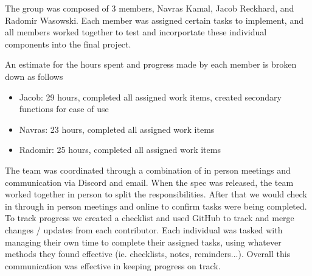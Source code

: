 The group was composed of 3 members, Navras Kamal, Jacob Reckhard, and
Radomir Wasowski.  Each member was assigned certain tasks to implement, and
all members worked together to test and incorportate these individual
components into the final project.

An estimate for the hours spent and progress made by each member is broken down as follows
\begin{itemize}
\item{Jacob: 29 hours, completed all assigned work items, created secondary functions for ease of use}
\item{Navras: 23 hours, completed all assigned work items}
\item{Radomir: 25 hours, completed all assigned work items}
\end{itemize}

The team was coordinated through a combination of in person meetings and
communication via Discord and email.  When the spec was released, the team
worked together in person to split the responsibilities.  After that we would
check in through in person meetings and online to confirm tasks were being
completed.  To track progress we created a checklist and used GitHub to track
and merge changes / updates from each contributor.  Each individual was tasked
with managing their own time to complete their assigned tasks, using whatever
methods they found effective (ie. checklists, notes, reminders...).  Overall
this communication was effective in keeping progress on track.
